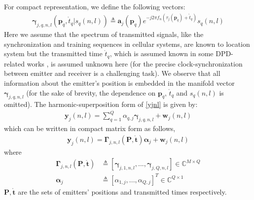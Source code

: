 \documentclass[review]{elsarticle}
\begin{document}
For compact representation, we define the following vectors:
\begin{align}\label{gamma}
    \boldsymbol{\gamma}_{j,q,n,l}(\boldsymbol{p}_q,\mathring{t}_q\vert s_q(n,l))\triangleq\boldsymbol{a}_j(\boldsymbol{p}_q)e^{-j2\pi f_n(\tau_j(\boldsymbol{p}_q)+\mathring{t}_q)}s_q(n,l)
\end{align}
Here we assume that the spectrum of transmitted signals, like the synchronization and training sequences in cellular systems, are known to location system but the transmitted time $\mathring{t}_q$, which is assumed known in some DPD-related works \cite{DPD2005,2006Efficient}, is assumed unknown here (for the precise clock-synchronization between emitter and receiver is a challenging task). We observe that all information about the emitter's position is embedded in the manifold vector $\boldsymbol{\gamma}_{j,q,n,l}$ (for the sake of brevity, the dependence on $\boldsymbol{p}_q$, $\mathring{t}_q$ and $s_q(n,l)$ is omitted). The harmonic-superposition form of \eqref{yjnl} is given by:
\begin{align}\label{yjnl2}
    \boldsymbol{y}_j(n,l)=\sum_{q=1}^Q\alpha_{q,j}\boldsymbol{\gamma}_{j,q,n,l}+\boldsymbol{w}_j(n,l)
\end{align}
which can be written in compact matrix form as follows,
\begin{align}
    \boldsymbol{y}_j(n,l)=\boldsymbol{\Gamma}_{j,n,l}(\boldsymbol{P},\mathring{\boldsymbol{t}})\boldsymbol{\alpha}_j+\boldsymbol{w}_j(n,l)
\end{align}
where  
\begin{align}\label{Gammajnl}
    \boldsymbol{\Gamma}_{j,n,l}(\boldsymbol{P},\mathring{\boldsymbol{t}})&\triangleq[\boldsymbol{\gamma}_{j,1,n,l},...,\boldsymbol{\gamma}_{j,Q,n,l}]\in \mathbb{C}^{M\times Q}\\ \nonumber
    \boldsymbol{\alpha}_j&\triangleq[\alpha_{1,j},...,\alpha_{Q,j}]^T\in \mathbb{C}^{Q\times 1} 
\end{align}
$\boldsymbol{P},\mathring{\boldsymbol{t}}$ are the sets of emitters' positions and transmitted times respectively.
\end{document}
